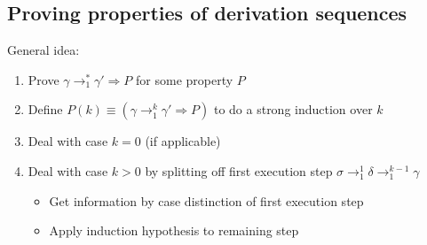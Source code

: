 \documentclass[11.5pt]{article}
\def\li{\rightarrow}
\begin{document}
\subsection{Proving properties of derivation sequences}
General idea:
\begin{enumerate}
    \item Prove  $\gamma \li_1^* \gamma' \Rightarrow P$ for some property $P$
    \item Define $P(k)\equiv (\gamma \li_1^k \gamma' \Rightarrow P)$ to do a strong induction
    over $k$ 
    \item Deal with case $k=0$ (if applicable)
    \item Deal with case $k>0$ by splitting off first execution step 
    $\sigma \li_1^1 \delta \li_1^{k-1} \gamma$
    \begin{itemize}
        \item Get information by case distinction of first execution step
        \item Apply induction hypothesis to remaining step
    \end{itemize}

\end{enumerate}
\end{document}
